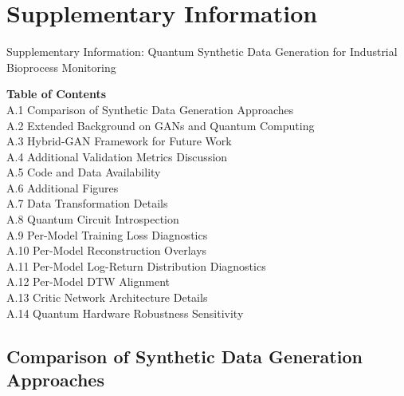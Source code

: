 \newpage
\setcounter{figure}{0}
\setcounter{table}{0}
\setcounter{equation}{0}
\renewcommand{\thefigure}{A\arabic{figure}}
\renewcommand{\thetable}{A\arabic{table}}
\renewcommand{\theequation}{A\arabic{equation}}
\makeatletter
\renewcommand{\theHfigure}{appendix.\thefigure}
\renewcommand{\theHtable}{appendix.\thetable}
\renewcommand{\theHequation}{appendix.\theequation}
\makeatother

\section{Supplementary Information}

Supplementary Information: Quantum Synthetic Data Generation for Industrial Bioprocess Monitoring

\textbf{Table of Contents}\\
A.1 Comparison of Synthetic Data Generation Approaches\\
A.2 Extended Background on GANs and Quantum Computing\\
A.3 Hybrid-GAN Framework for Future Work\\
A.4 Additional Validation Metrics Discussion\\
A.5 Code and Data Availability\\
A.6 Additional Figures\\
A.7 Data Transformation Details\\
A.8 Quantum Circuit Introspection\\
A.9 Per-Model Training Loss Diagnostics\\
A.10 Per-Model Reconstruction Overlays\\
A.11 Per-Model Log-Return Distribution Diagnostics\\
A.12 Per-Model DTW Alignment\\
A.13 Critic Network Architecture Details\\
A.14 Quantum Hardware Robustness Sensitivity

\subsection{Comparison of Synthetic Data Generation Approaches}

